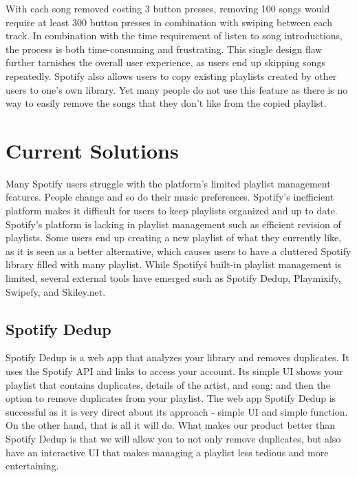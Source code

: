 \documentclass{article}
\begin{document}


With each song removed costing 3 button presses, removing 100 songs would require at least 300 button presses in combination with swiping between each track.  In combination with the time requirement of listen to song introductions, the process is both time-consuming and frustrating.  This single design flaw further tarnishes the overall user experience, as users end up skipping songs repeatedly.  Spotify also allows users to copy existing playlists created by other users to one's own library.  Yet many people do not use this feature as there is no way to easily remove the songs that they don’t like from the copied playlist.\\

\section{Current Solutions}
Many Spotify users struggle with the platform's limited playlist management features. People change and so do their music preferences. Spotify’s inefficient platform makes it difficult for users to keep playlists organized and up to date.\\

Spotify's platform is lacking in playlist management such as efficient revision of playlists. Some users end up creating a new playlist of what they currently like, as it is seen as a better alternative, which causes users to have a cluttered Spotify library filled with many playlist. While Spotify\'s built-in playlist management is limited, several external tools have emerged such as Spotify Dedup, Playmixify, Swipefy, and Skiley.net.

\subsection{Spotify Dedup}
\quad Spotify Dedup is a web app that analyzes your library and removes duplicates. It uses the Spotify API and links to access your account. Its simple UI shows your playlist that contains duplicates, details of the artist, and song: and then the option to remove duplicates from your playlist. \cite{Spotify_dedup} The web app Spotify Dedup is successful as it is very direct about its approach - simple UI and simple function. On the other hand, that is all it will do. What makes our product better than Spotify Dedup is that we will allow you to not only remove duplicates, but also have an interactive UI that makes managing a playlist less tedious and more entertaining. 
\end{document}
